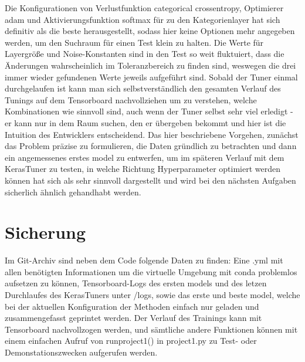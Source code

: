 \documentclass[letterpaper,10pt]{article}
\begin{document}
    Die Konfigurationen von Verlustfunktion categorical crossentropy, Optimierer adam und Aktivierungsfunktion softmax für zu den Kategorienlayer hat sich definitiv als die beste herausgestellt, sodass hier keine Optionen mehr angegeben werden, um den Suchraum für einen Test klein zu halten. Die Werte für Layergröße und Noise-Konstanten sind in den Test so weit fluktuiert, dass die Änderungen wahrscheinlich im Toleranzbereich zu finden sind, weswegen die drei immer wieder gefundenen Werte jeweils aufgeführt sind. Sobald der Tuner einmal durchgelaufen ist kann man sich selbstverständlich den gesamten Verlauf des Tunings auf dem Tensorboard nachvollziehen um zu verstehen, welche Kombinationen wie sinnvoll sind, auch wenn der Tuner selbst sehr viel erledigt - er kann nur in dem Raum suchen, den er übergeben bekommt und hier ist die Intuition des Entwicklers entscheidend.
    Das hier beschriebene Vorgehen, zunächst das Problem präzise zu formulieren, die Daten gründlich zu betrachten und dann ein angemessenes erstes model zu entwerfen, um im späteren Verlauf mit dem KerasTuner zu testen, in welche Richtung Hyperparameter optimiert werden können hat sich als sehr sinnvoll dargestellt und wird bei den nächsten Aufgaben sicherlich ähnlich gehandhabt werden. 

\newpage

\section{Sicherung}
    Im Git-Archiv sind neben dem Code folgende Daten zu finden: Eine .yml mit allen benötigten Informationen um die virtuelle Umgebung mit conda problemlos aufsetzen zu können, Tensorboard-Logs des ersten models und des letzen Durchlaufes des KerasTuners unter /logs, sowie das erste und beste model, welche bei der aktuellen Konfiguration der Methoden einfach nur geladen und zusammengefasst geprintet werden. Der Verlauf des Trainings kann mit Tensorboard nachvollzogen werden, und sämtliche andere Funktionen können mit einem einfachen Aufruf von runproject1() in project1.py zu Test- oder Demonstationszwecken aufgerufen werden.

\newpage
\printbibliography
\end{document}
